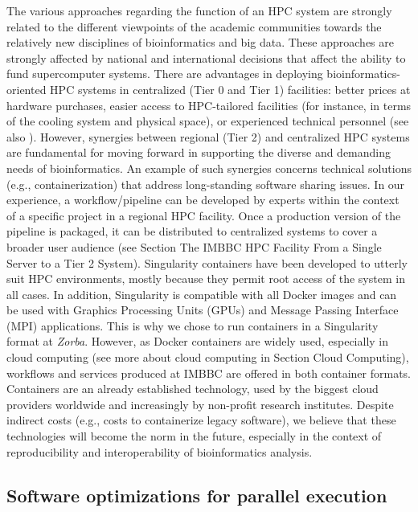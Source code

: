    The various approaches regarding the function of an HPC system are strongly related to the different viewpoints of the academic communities towards the relatively new disciplines of bioinformatics and big data. 
   These approaches are strongly affected by national and international decisions that affect the ability to fund supercomputer systems. 
   There are advantages in deploying bioinformatics-oriented HPC systems in centralized (Tier 0 and Tier 1) facilities: 
   better prices at hardware purchases, easier access to HPC-tailored facilities (for instance, in terms of the cooling system and physical space), or experienced technical personnel 
   (see also \citep{lampa2013lessons}). 
   However, synergies between regional (Tier 2) and centralized HPC systems are fundamental for moving forward in supporting the diverse and demanding needs of bioinformatics. 
   An example of such synergies concerns technical solutions (e.g., containerization) that address long-standing software sharing issues. 
   In our experience, a workflow/pipeline can be developed by experts within the context of a specific project in a regional HPC facility. Once a production version of the pipeline is packaged, it can be distributed to centralized systems to cover a broader user audience (see Section The IMBBC HPC Facility From a Single Server to a Tier 2 System). 
   Singularity containers have been developed to utterly suit HPC environments, mostly because they permit root access of the system in all cases. 
   In addition, Singularity is compatible with all Docker images and can be used with Graphics Processing Units (GPUs) and Message Passing Interface (MPI) applications. This is why we chose to run containers in a Singularity format at \textit{Zorba}. 
   However, as Docker containers are widely used, especially in cloud computing (see more about cloud computing in Section Cloud Computing), workflows and services produced at IMBBC are offered in both container formats. 
   Containers are an already established technology, used by the biggest cloud providers worldwide and increasingly by non-profit research institutes. Despite indirect costs (e.g., costs to containerize legacy software), we believe that these technologies will become the norm in the future, especially in the context of reproducibility and interoperability of bioinformatics analysis.


   \subsection*{Software optimizations for parallel execution}

